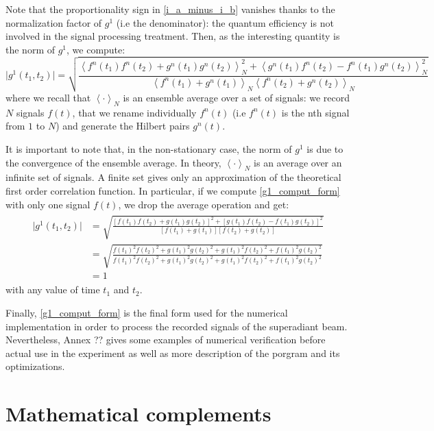 \documentclass[12pt]{report}
\begin{document}
Note that the proportionality sign in \eqref{i_a_minus_i_b} vanishes thanks to the normalization factor of $g^1$ (i.e the denominator): the quantum efficiency is not involved in the signal processing treatment. Then, as the interesting quantity is the norm of $g^1$, we compute:
\begin{equation}
\label{g1_comput_form}
\vert g^1(t_1, t_2) \vert = \sqrt{\frac{\left\langle f^n(t_1)f^n(t_2) + g^n(t_1)g^n(t_2) \right\rangle^2_N + \left\langle g^n(t_1)f^n(t_2) - f^n(t_1)g^n(t_2) \right\rangle^2_N}{\left\langle f^n(t_1) + g^n(t_1) \right\rangle_N \left\langle f^n(t_2) + g^n(t_2) \right\rangle_N}}
\end{equation}
where we recall that $\left\langle \cdot \right\rangle_N$ is an ensemble average over a set of signals: we record $N$ signals $f(t)$, that we rename individually $f^n(t)$ (i.e $f^n(t)$ is the nth signal from $1$ to $N$) and generate the Hilbert pairs $g^n(t)$.

It is important to note that, in the non-stationary case, the norm of $g^1$ is due to the convergence of the ensemble average. In theory, $\left\langle \cdot \right\rangle_N$ is an average over an infinite set of signals. A finite set gives only an approximation of the theoretical first order correlation function. In particular, if we compute \eqref{g1_comput_form} with only one signal $f(t)$, we drop the average operation and get:
\begin{align}
\begin{split}
\vert g^1(t_1, t_2) \vert &= \sqrt{\frac{\left[f(t_1)f(t_2) + g(t_1)g(t_2) \right]^2 + \left[g(t_1)f(t_2) - f(t_1)g(t_2) \right]^2}{\left[f(t_1) + g(t_1) \right] \left[ f(t_2) + g(t_2) \right]}}\\
&= \sqrt{\frac{f(t_1)^2f(t_2)^2 + g(t_1)^2g(t_2)^2 + g(t_1)^2f(t_2)^2 + f(t_1)^2g(t_2)^2}{f(t_1)^2f(t_2)^2 + g(t_1)^2g(t_2)^2 + g(t_1)^2f(t_2)^2 + f(t_1)^2g(t_2)^2}}\\
&= 1
\end{split}
\end{align}
with any value of time $t_1$ and $t_2$.

Finally, \eqref{g1_comput_form} is the final form used for the numerical implementation in order to process the recorded signals of the superadiant beam. Nevertheless, Annex ?? gives some examples of numerical verification before actual use in the experiment as well as more description of the porgram and its optimizations.


\appendix
\chapter{Mathematical complements}
\end{document}
